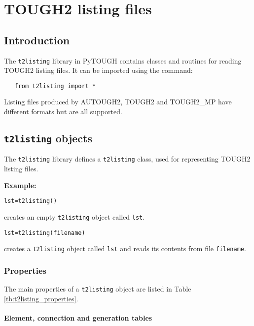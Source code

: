\chapter{TOUGH2 listing files}
\label{listingfiles}

\section{Introduction}
The \texttt{t2listing} library in PyTOUGH contains classes and routines for reading TOUGH2 listing files.  It can be imported using the command:

\begin{verbatim}
   from t2listing import *
\end{verbatim}

Listing files produced by AUTOUGH2, TOUGH2 and TOUGH2\_MP have different formats but are all supported.

\section{\texttt{t2listing} objects}

The \texttt{t2listing} library defines a \texttt{t2listing} class, used for representing TOUGH2 listing files.

\textbf{Example:}

\begin{verbatim}
lst=t2listing()
\end{verbatim}

creates an empty \texttt{t2listing} object called \texttt{lst}.

\begin{verbatim}
lst=t2listing(filename)
\end{verbatim}

creates a \texttt{t2listing} object called \texttt{lst} and reads its contents from file \texttt{filename}.

\subsection{Properties}

The main properties of a \texttt{t2listing} object are listed in Table \ref{tb:t2listing_properties}.

\subsubsection{Element, connection and generation tables}

